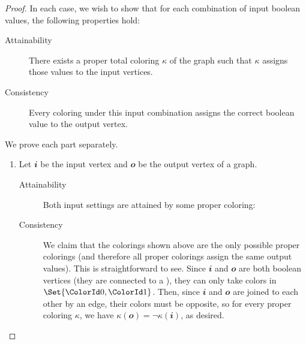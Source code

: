 \begin{proof}

  In each case, we wish to show that for each combination of input boolean
  values, the following properties hold:
  \begin{description}
  \item[Attainability] There exists a proper total coloring \(κ\) of the graph
    such that \(κ\) assigns those values to the input vertices.
  \item[Consistency] Every coloring under this input combination assigns the
    correct boolean value to the output vertex.
  \end{description}

  We prove each part separately.
  \begin{enumerate}

    \item Let \(𝒊\) be the input vertex and \(𝒐\) be the output vertex of a
      \NOT{} graph.

      \begin{description}
      \item[Attainability] Both input settings are attained by some proper
        coloring:

        \begin{center}
        \end{center}

      \item[Consistency] We claim that the colorings shown above are the only
        possible proper colorings (and therefore all proper colorings assign the
        same output values).  This is straightforward to see.  Since \(𝒊\) and
        \(𝒐\) are both boolean vertices (they are connected to a ),
        they can only take colors in \(\Set{\ColorId0,\ColorId1}\).  Then, since
        \(𝒊\) and \(𝒐\) are joined to each other by an edge, their colors must
        be opposite, so for every proper coloring \(κ\), we have \(κ(𝒐)=¬κ(𝒊)\),
        as desired.


\end{description}
\end{enumerate}
\end{proof}
